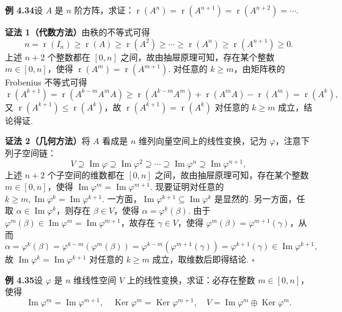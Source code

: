 \documentclass[UTF8, 12pt, fontset=fandol, oneside]{ctexart}
\begin{document}
\noindent\textbf{例 4.34}\quad 设 $A$ 是 $n$ 阶方阵，求证：$\operatorname{r}(A^n)=\operatorname{r}(A^{n+1})=\operatorname{r}(A^{n+2})=\cdots$.

\noindent\textbf{证法 1（代数方法）}\quad 由秩的不等式可得
\[
n=\operatorname{r}(I_n)\ge \operatorname{r}(A)\ge \operatorname{r}(A^2)\ge\cdots\ge \operatorname{r}(A^n)\ge \operatorname{r}(A^{n+1})\ge0.
\]
上述 $n+2$ 个整数都在 $[0,n]$ 之间，故由抽屉原理可知，存在某个整数 $m\in[0,n]$，使得 $\operatorname{r}(A^m)=\operatorname{r}(A^{m+1})$. 对任意的 $k\ge m$，由矩阵秩的 Frobenius 不等式可得
\[
\operatorname{r}(A^{k+1})=\operatorname{r}(A^{k-m}A^mA)\ge \operatorname{r}(A^{k-m}A^m)+\operatorname{r}(A^mA)-\operatorname{r}(A^m)=\operatorname{r}(A^k),
\]
又 $\operatorname{r}(A^{k+1})\le\operatorname{r}(A^k)$，故 $\operatorname{r}(A^{k+1})=\operatorname{r}(A^k)$ 对任意的 $k\ge m$ 成立，结论得证.

\noindent\textbf{证法 2（几何方法）}\quad 将 $A$ 看成是 $n$ 维列向量空间上的线性变换，记为 $\varphi$，注意下列子空间链：
\[
V\supseteq\operatorname{Im}\varphi\supseteq\operatorname{Im}\varphi^2\supseteq\cdots\supseteq\operatorname{Im}\varphi^n\supseteq\operatorname{Im}\varphi^{n+1},
\]
上述 $n+2$ 个子空间的维数都在 $[0,n]$ 之间，故由抽屉原理可知，存在某个整数 $m\in[0,n]$，使得 $\operatorname{Im}\varphi^m=\operatorname{Im}\varphi^{m+1}$. 现要证明对任意的 $k\ge m,\operatorname{Im}\varphi^k=\operatorname{Im}\varphi^{k+1}$. 一方面，$\operatorname{Im}\varphi^{k+1}\subseteq\operatorname{Im}\varphi^k$ 是显然的. 另一方面，任取 $\alpha\in\operatorname{Im}\varphi^k$，则存在 $\beta\in V$，使得 $\alpha=\varphi^k(\beta)$. 由于 $\varphi^m(\beta)\in\operatorname{Im}\varphi^m=\operatorname{Im}\varphi^{m+1}$，故存在 $\gamma\in V$，使得 $\varphi^m(\beta)=\varphi^{m+1}(\gamma)$，从而
\[
\alpha=\varphi^k(\beta)=\varphi^{k-m}(\varphi^m(\beta))=\varphi^{k-m}(\varphi^{m+1}(\gamma))=\varphi^{k+1}(\gamma)\in\operatorname{Im}\varphi^{k+1},
\]
故 $\operatorname{Im}\varphi^k=\operatorname{Im}\varphi^{k+1}$ 对任意的 $k\ge m$ 成立，取维数后即得结论. $\square$

\noindent\textbf{例 4.35}\quad 设 $\varphi$ 是 $n$ 维线性空间 $V$ 上的线性变换，求证：必存在整数 $m\in[0,n]$，使得
\[
\operatorname{Im}\varphi^m=\operatorname{Im}\varphi^{m+1},\quad
\operatorname{Ker}\varphi^m=\operatorname{Ker}\varphi^{m+1},\quad
V=\operatorname{Im}\varphi^m\oplus\operatorname{Ker}\varphi^m.
\]
\end{document}

